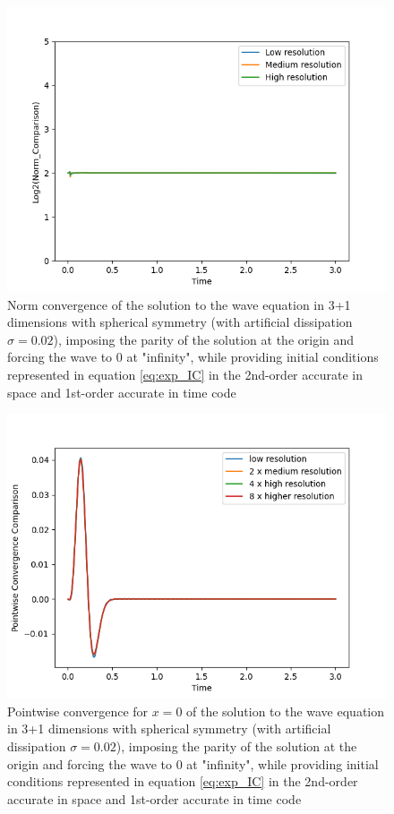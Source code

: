 \begin{figure}[t!]
    \centering
    \includegraphics[width=\columnwidth]{Images/spherical_wave-2nd-norm.png}
    \caption{Norm convergence of the solution to the wave equation in 3+1 dimensions with spherical symmetry (with artificial dissipation $\sigma = 0.02$), imposing the parity of the solution at the origin and forcing the wave to 0 at "infinity", while providing initial conditions represented in equation \eqref{eq:exp_IC} in the 2nd-order accurate in space and 1st-order accurate in time code}
    \label{fig:norm_spherical_wave_2nd_order}
\end{figure}

\begin{figure}[t!]
    \centering
    \includegraphics[width=\columnwidth]{Images/spherical_wave-2nd-point.png}
    \caption{Pointwise convergence for $x = 0$ of the solution to the wave equation in 3+1 dimensions with spherical symmetry (with artificial dissipation $\sigma = 0.02$), imposing the parity of the solution at the origin and forcing the wave to 0 at "infinity", while providing initial conditions represented in equation \eqref{eq:exp_IC} in the 2nd-order accurate in space and 1st-order accurate in time code}
    \label{fig:point_spherical_wave_2nd_order}
\end{figure}


